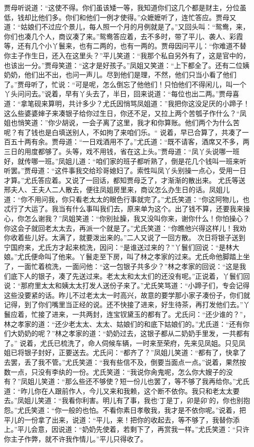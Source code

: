\documentclass[12pt,oneside]{book}
\begin{document}
贾母听说道：“这使不得。你们虽该矮一等，我知道你们这几个都是财主，分位虽低，钱却比他们多。你们和他们一例才使得。”众嬷嬷听了，连忙答应。贾母又道：“姑娘们不过应个景儿，每人照一个月的月例就是了。”又回头叫：“鸳鸯，来，你们也凑几个人，商议凑了来。”鸳鸯答应着，去不多时，带了平儿、袭人、彩霞等，还有几个小丫鬟来，也有二两的，也有一两的。贾母因问平儿：“你难道不替你主子作生日，还入在这里头？”平儿笑道：“我那个私自另外有了，这是官中的，也该出一分。”贾母笑道：“这才是好孩子。”凤姐又笑道：“上下都全了。还有二位姨奶奶，他们出不出，也问一声儿。尽到他们是理，不然，他们只当小看了他们了。”贾母听了，忙说：“可是呢，怎么倒忘了他他们！只怕他们不得闲儿，叫一个丫头问问去。”说着，早有丫头去了，半日，回来说道：“每位也出二两。”贾母喜道：“拿笔砚来算明，共计多少？尤氏因悄骂凤姐道：”我把你这没足厌的小蹄子！这么些婆婆婶子来凑银子给你过生日，你还不足，又拉上两个苦瓠子作什么？“凤姐也悄笑道：”你少胡说，一会子离了这里，我才和你算账。他们两个为什么苦呢？有了钱也是白填送别人，不如拘了来咱们乐。“
说着，早已合算了，共凑了一百五十两有余。贾母道：“一日戏酒用不了。”尤氏道：“既不请客，酒席又不多，两三日的用度都够了。头等，戏不用钱，省在这上头。”贾母道：“凤丫头说哪一班好，就传哪一班。”凤姐儿道：“咱们家的班子都听熟了，倒是花几个钱叫一班来听听罢。”贾母道：“这件事我交给珍哥媳妇了。索性叫凤丫头别操一点心，受用一日才算。”尤氏答应着。又说了一回话，都知贾母乏了，才渐渐的散出来。
尤氏等送邢夫人、王夫人二人散去，便往凤姐房里来，商议怎么办生日的话。凤姐儿道：“你不用问我，你只看老太太的眼色行事就完了。”尤氏笑道：“你这阿物儿，也忒行了大运了。我当有什么事叫我们去，原来单为这个。出了钱不算，还要我来操心，你怎么谢我？”凤姐笑道：“你别扯臊，我又没叫你来，谢你什么！你怕操心？你这会子就回老太太去，再派一个就是了。”尤氏笑道：“你瞧他兴得这样儿！我劝你收着些儿好。太满了，就要泼出来的。”二人又说了一回方散。
次日将银子送到宁国府来，尤氏方才起来梳洗，因问：“是谁送过来的？”丫鬟们回说：“是林大娘。”尤氏便命叫了他来。丫鬟走至下房，叫了林之孝家的过来。尤氏命他脚踏上坐了，一面忙着梳洗，一面问他：“这一包银子共多少？”林之孝家的回说：“这是我们底下人的银子，凑了先送过来。老太太和太太们的还没有呢。”正说着，丫鬟们回说：“那府里太太和姨太太打发人送份子来了。”尤氏笑骂道：“小蹄子们，专会记得这些没要紧的话。昨儿不过老太太一时高兴，故意的要学那小家子凑份子，你们就记得，到了你们嘴里当正经的说。还不快接了进来，好生待茶，再打发他们去。”丫鬟应着，忙接了进来，一共两封，连宝钗黛玉的都有了。尤氏问：“还少谁的？”，林之孝家的道：“还少老太太、太太、姑娘们的和底下姑娘们的。”尤氏道：“还有你们大奶奶的呢？”林之孝家的道：“奶奶过去，这银子都从二奶奶手里发，一共都有了。”
说着，尤氏已梳洗了，命人伺候车辆，一时来至荣府，先来见凤姐。只见凤姐已将银子封好，正要送去。尤氏问：“都齐了？”凤姐儿笑道：“都有了，快拿了去罢，丢了我不管。”尤氏笑道：“我有些信不及，倒要当面点一点。”说着，果然按数一点，只没有李纨的一份。尤氏笑道：“我说你肏鬼呢，怎么你大嫂子的没有？”凤姐儿笑道：“那么些还不够使？短一份儿也罢了，等不够了我再给你。”尤氏道：“昨儿你在人跟前作人，今儿又来和我赖，这个断不依你。我只和老太太要去。”凤姐儿笑道：“我看你利害。明儿有了事，我也‘丁是丁，卯是卯’的，你也别抱怨。”尤氏笑道：“你一般的也怕。不看你素日孝敬我，我才是不依你呢。”说着，把平儿的一份拿了出来，说道：“平儿，来！把你的收起去，等不够了，我替你添上。”平儿会意，因说道：“奶奶先使着，若剩下了，再赏我一样。”尤氏笑道：“只许你主子作弊，就不许我作情儿。”平儿只得收了。
\end{document}
